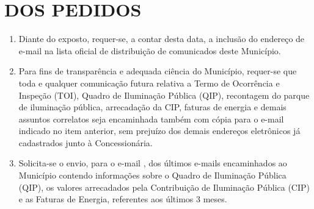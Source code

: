 \section{DOS PEDIDOS}

\newcommand{\tipoRequerimento}{Solicitação de Inclusão de E-mails}


\begin{enumerate}[resume]
  \item Diante do exposto, requer-se, a contar desta data, a inclusão do endereço de e-mail \textbf{\EmailEmpresa} na lista oficial de distribuição de comunicados deste Município.
  \label{item:email_empresa}
  \item Para fins de transparência e adequada ciência do Município, requer-se que toda e qualquer comunicação futura relativa a Termo de Ocorrência e Inspeção (TOI), Quadro de Iluminação Pública (QIP), recontagem do parque de iluminação pública, arrecadação da CIP, faturas de energia e demais assuntos correlatos seja encaminhada também com cópia para o e-mail indicado no item anterior, sem prejuízo dos demais endereços eletrônicos já cadastrados junto à Concessionária.
  \item Solicita-se o envio, para o e-mail \EmailEmpresa, dos últimos e-mails encaminhados ao Município contendo informações sobre o Quadro de Iluminação Pública (QIP), os valores arrecadados pela Contribuição de Iluminação Pública (CIP) e as Faturas de Energia, referentes aos últimos 3 meses.
\end{enumerate}
